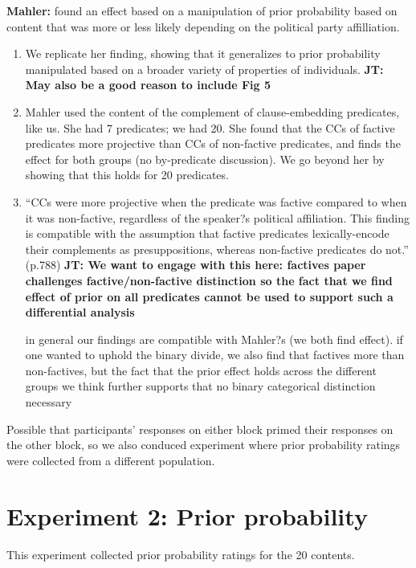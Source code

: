 \documentclass[11pt,fleqn]{article}
\newcommand{\6}{\mbox{$[\hspace*{-.6mm}[$}}
\newcommand{\9}{\mbox{$]\hspace*{-.6mm}]$}}
\newcommand{\jt}[1]{\textbf{\color{blue}JT: #1}}
\begin{document}
{\bf Mahler:} found an effect based on a manipulation of prior probability based on content that was more or less likely depending on the political party affilliation. 

\begin{enumerate}

\item We replicate her finding, showing that it generalizes to prior probability manipulated based on a broader variety of properties of individuals. \jt{May also be a good reason to include Fig 5}

\item Mahler used the content of the complement of clause-embedding predicates, like us. She had 7 predicates; we had 20. She found that the CCs of factive predicates more projective than CCs of non-factive predicates, and finds the effect for both groups (no by-predicate discussion). We go beyond her by showing that this holds for 20 predicates.

\item ``CCs were more projective when the predicate was factive compared to when it was non-factive, regardless of the speaker?s political affiliation. This finding is compatible with the assumption that factive predicates lexically-encode their complements as presuppositions, whereas non-factive predicates do not.'' (p.788) \jt{We want to engage with this here: factives paper challenges factive/non-factive distinction so the fact that we find effect of prior on all predicates cannot be used to support such a differential analysis}

in general our findings are compatible with Mahler?s (we both find effect). if one wanted to uphold the binary divide, we also find that factives more than non-factives, but the fact that the prior effect holds across the different groups we think further supports that no binary categorical distinction necessary

\end{enumerate}

Possible that participants' responses on either block primed their responses on the other block, so we also conduced experiment where prior probability ratings were collected from a different population.

\section{Experiment 2: Prior probability}

This experiment collected prior probability ratings for the 20 contents.
\end{document}
